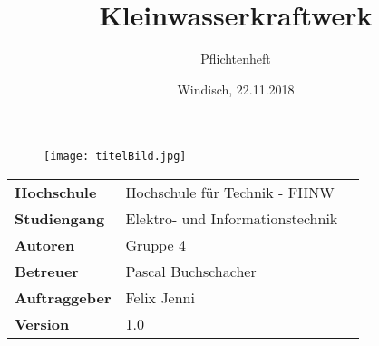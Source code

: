 \documentclass[final]{fhnwreport}       %
\title{Kleinwasserkraftwerk}          	%
\author{Pflichtenheft}          		%
\date{Windisch, 22.11.2018}             %
\begin{document}
\maketitle

\vspace*{-1cm}						    %
\vfill
\begin{figure}[H]
\centering
\texttt{[image: titelBild.jpg]}
\end{figure}
\vfill

{
\renewcommand\arraystretch{2}
\begin{center}
\begin{tabular}{ >{\bf} l p{10cm} l }
Hochschule&Hochschule für Technik - FHNW\\
Studiengang&Elektro- und Informationstechnik\\
Autoren&Gruppe 4\\%
Betreuer&Pascal Buchschacher\\
Auftraggeber&Felix Jenni\\
Version&1.0 %
\end{tabular}
\end{center}
}

\clearpage

\thispagestyle{empty}
			
\tableofcontents
\clearpage








\end{document}
